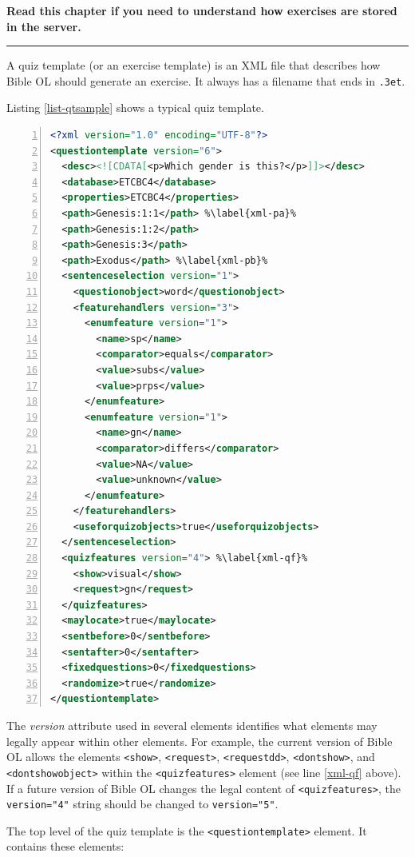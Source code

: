 \documentclass[11pt,oneside,a4paper]{memoir}
\newcommand*{\xml}[1]{\texttt{<#1>}}
\newcommand*{\xmla}[1]{\texttt{#1}} %
\begin{document}
\textbf{Read this chapter if you need to understand how exercises are stored in the server.}
\plainbreak{3}


A quiz template (or an exercise template) is an XML
file that describes how Bible OL should generate an exercise. It always has a filename that ends in
\texttt{.3et}.

Listing \ref{list-qtsample} shows a typical quiz template.

\begin{lstlisting}[language=XML,numbers=left,caption=Quiz template sample,label=list-qtsample]
<?xml version="1.0" encoding="UTF-8"?>
<questiontemplate version="6">
  <desc><![CDATA[<p>Which gender is this?</p>]]></desc>
  <database>ETCBC4</database>
  <properties>ETCBC4</properties>
  <path>Genesis:1:1</path> %\label{xml-pa}%
  <path>Genesis:1:2</path>
  <path>Genesis:3</path>
  <path>Exodus</path> %\label{xml-pb}%
  <sentenceselection version="1">
    <questionobject>word</questionobject>
    <featurehandlers version="3">
      <enumfeature version="1">
        <name>sp</name>
        <comparator>equals</comparator>
        <value>subs</value>
        <value>prps</value>
      </enumfeature>
      <enumfeature version="1">
        <name>gn</name>
        <comparator>differs</comparator>
        <value>NA</value>
        <value>unknown</value>
      </enumfeature>
    </featurehandlers>
    <useforquizobjects>true</useforquizobjects>
  </sentenceselection>
  <quizfeatures version="4"> %\label{xml-qf}%
    <show>visual</show>
    <request>gn</request>
  </quizfeatures>
  <maylocate>true</maylocate>
  <sentbefore>0</sentbefore>
  <sentafter>0</sentafter>
  <fixedquestions>0</fixedquestions>
  <randomize>true</randomize>
</questiontemplate>
\end{lstlisting}

The \emph{version} attribute used in several elements identifies what elements may legally appear
within other elements. For example, the current version of Bible OL allows the elements \xml{show},
\xml{request}, \xml{requestdd}, \xml{dontshow}, and \xml{dontshowobject} within the \xml{quizfeatures} element (see line
\ref{xml-qf} above). If a future version of Bible OL changes the legal content of
\xml{quizfeatures}, the \xmla{version="4"} string should be changed to \xmla{version="5"}.


The top level of the quiz template is the \xml{questiontemplate} element. It contains these
elements:
\end{document}
